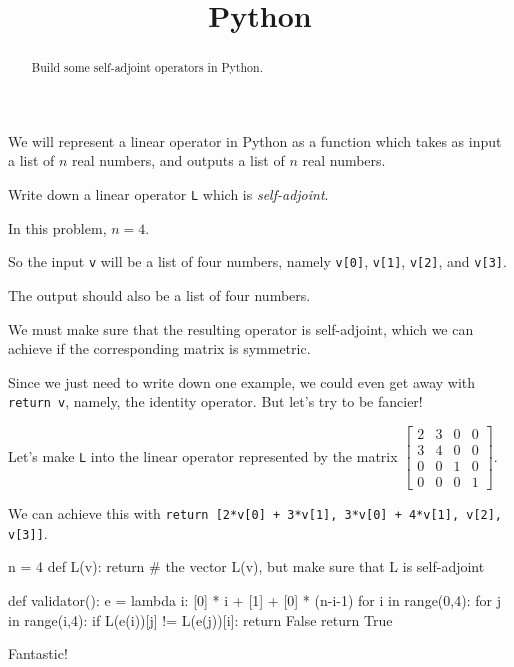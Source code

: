 \documentclass{ximera}
\title{Python}
\begin{document}
\begin{abstract}
  Build some self-adjoint operators in Python.
\end{abstract}	

\begin{question}
  We will represent a linear operator in Python as a function which takes as input a list of $n$ real numbers, and outputs a list of $n$ real numbers.

  Write down a linear operator \texttt{L} which is \textit{self-adjoint}.
  \begin{solution}
    \begin{hint}
      In this problem, $n = 4$.
    \end{hint}
    \begin{hint}
      So the input \texttt{v} will be a list of four numbers, namely \texttt{v[0]}, \texttt{v[1]}, \texttt{v[2]}, and \texttt{v[3]}.
    \end{hint}
    \begin{hint}
      The output should also be a list of four numbers.
    \end{hint}
    \begin{hint}
      We must make sure that the resulting operator is self-adjoint, which we can achieve if the corresponding matrix is symmetric.
    \end{hint}
    \begin{hint}
      Since we just need to write down one example, we could even get away with \texttt{return v}, namely, the identity operator.  But let's try to be fancier!
    \end{hint}
    \begin{hint}
      Let's make \texttt{L} into the linear operator represented by the matrix $\begin{bmatrix} 2 & 3 & 0 & 0 \\ 3 & 4 & 0 & 0 \\ 0 & 0 & 1 & 0 \\ 0 & 0 & 0 & 1 \end{bmatrix}$.
    \end{hint}
    \begin{hint}
      We can achieve this with \texttt{return [2*v[0] + 3*v[1], 3*v[0] + 4*v[1], v[2], v[3]]}.
    \end{hint}
    \begin{python}
n = 4
def L(v):
  return # the vector L(v), but make sure that L is self-adjoint

def validator():
  e = lambda i: [0] * i + [1] + [0] * (n-i-1)
  for i in range(0,4):
    for j in range(i,4):   
      if L(e(i))[j] != L(e(j))[i]:
        return False
  return True
    \end{python}
  \end{solution}

Fantastic!

\end{question}
\end{document}
